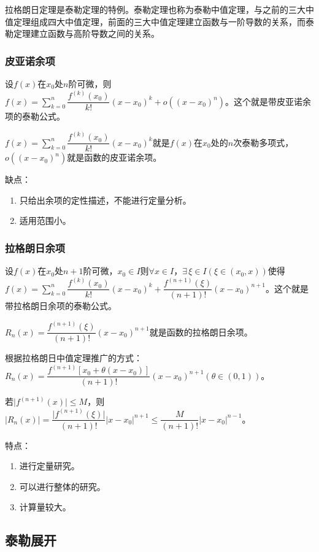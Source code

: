 \documentclass[UTF8, 12pt]{ctexart}
\begin{document}
拉格朗日定理是泰勒定理的特例。泰勒定理也称为泰勒中值定理，与之前的三大中值定理组成四大中值定理，前面的三大中值定理建立函数与一阶导数的关系，而泰勒定理建立函数与高阶导数之间的关系。

\subsubsection{皮亚诺余项}

设$f(x)$在$x_0$处$n$阶可微，则$f(x)=\sum_{k=0}^n\dfrac{f^{(k)}(x_0)}{k!}(x-x_0)^k+o((x-x_0)^n)$。这个就是带皮亚诺余项的泰勒公式。

$f(x)=\sum_{k=0}^n\dfrac{f^{(k)}(x_0)}{k!}(x-x_0)^k$就是$f(x)$在$x_0$处的$n$次泰勒多项式，$o((x-x_0)^n)$就是函数的皮亚诺余项。

缺点：

\begin{enumerate}
    \item 只给出余项的定性描述，不能进行定量分析。
    \item 适用范围小。
\end{enumerate}

\subsubsection{拉格朗日余项}

设$f(x)$在$x_0$处$n+1$阶可微，$x_0\in I$则$\forall x\in I$，$\exists\,\xi\in I(\xi\in(x_0,x))$使得$f(x)=\sum_{k=0}^n\dfrac{f^{(k)}(x_0)}{k!}(x-x_0)^k+\dfrac{f^{(n+1)}(\xi)}{(n+1)!}(x-x_0)^{n+1}$。这个就是带拉格朗日余项的泰勒公式。

$R_n(x)=\dfrac{f^{(n+1)}(\xi)}{(n+1)!}(x-x_0)^{n+1}$就是函数的拉格朗日余项。

根据拉格朗日中值定理推广的方式：$R_n(x)=\dfrac{f^{(n+1)}[x_0+\theta(x-x_0)]}{(n+1)!}(x-x_0)^{n+1}(\theta\in(0,1))$。

若$\vert f^{(n+1)}(x)\vert\leqslant M$，则$\vert R_n(x)\vert=\dfrac{\vert f^{(n+1)}(\xi)\vert}{(n+1)!}\vert x-x_0\vert^{n+1}\leqslant\dfrac{M}{(n+1)!}\vert x-x_0\vert^{n-1}$。

特点：

\begin{enumerate}
    \item 进行定量研究。
    \item 可以进行整体的研究。
    \item 计算量较大。
\end{enumerate}

\subsection{泰勒展开}
\end{document}
